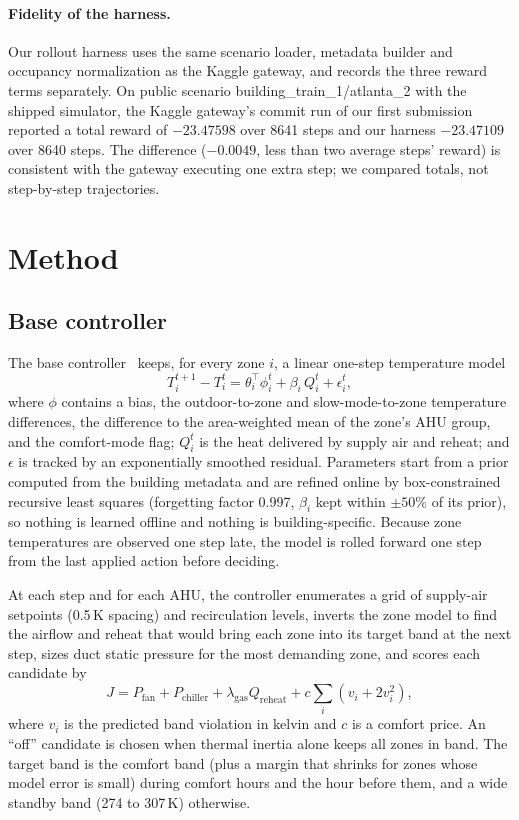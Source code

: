 \documentclass{article}
\begin{document}
\paragraph{Fidelity of the harness.} Our rollout harness uses the same scenario loader, metadata builder and occupancy normalization as the Kaggle gateway, and records the three reward terms separately. On public scenario building\_train\_1/atlanta\_2 with the shipped simulator, the Kaggle gateway's commit run of our first submission reported a total reward of $-23.47598$ over 8641 steps and our harness $-23.47109$ over 8640 steps. The difference ($-0.0049$, less than two average steps' reward) is consistent with the gateway executing one extra step; we compared totals, not step-by-step trajectories.

\section{Method}

\subsection{Base controller}
The base controller~\citep{wu2026cpu} keeps, for every zone $i$, a linear one-step temperature model
\begin{equation}
  T_i^{t+1} - T_i^{t} = \theta_i^\top \phi_i^t + \beta_i\, Q_i^t + \epsilon_i^t,
\end{equation}
where $\phi$ contains a bias, the outdoor-to-zone and slow-mode-to-zone temperature differences, the difference to the area-weighted mean of the zone's AHU group, and the comfort-mode flag; $Q_i^t$ is the heat delivered by supply air and reheat; and $\epsilon$ is tracked by an exponentially smoothed residual. Parameters start from a prior computed from the building metadata and are refined online by box-constrained recursive least squares (forgetting factor 0.997, $\beta_i$ kept within $\pm50\%$ of its prior), so nothing is learned offline and nothing is building-specific. Because zone temperatures are observed one step late, the model is rolled forward one step from the last applied action before deciding.

At each step and for each AHU, the controller enumerates a grid of supply-air setpoints (0.5\,K spacing) and recirculation levels, inverts the zone model to find the airflow and reheat that would bring each zone into its target band at the next step, sizes duct static pressure for the most demanding zone, and scores each candidate by
\begin{equation}
  J = P_{\mathrm{fan}} + P_{\mathrm{chiller}} + \lambda_{\mathrm{gas}} Q_{\mathrm{reheat}} + c \sum_i \left(v_i + 2 v_i^2\right),
\end{equation}
where $v_i$ is the predicted band violation in kelvin and $c$ is a comfort price. An ``off'' candidate is chosen when thermal inertia alone keeps all zones in band. The target band is the comfort band (plus a margin that shrinks for zones whose model error is small) during comfort hours and the hour before them, and a wide standby band (274 to 307\,K) otherwise.
\end{document}
